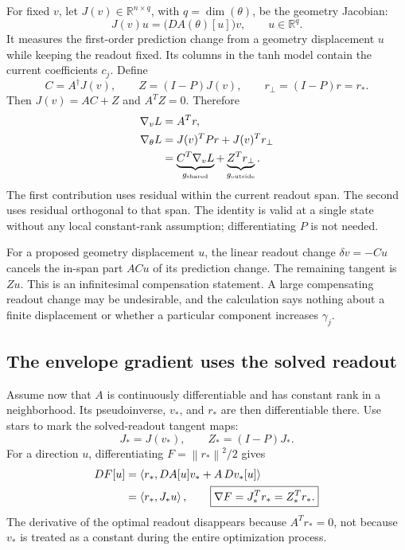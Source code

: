 \documentclass[11pt]{article}
\theoremstyle{remark}
\newcommand{\R}{\mathbb{R}}
\newcommand{\norm}[1]{\left\lVert #1\right\rVert}
\newcommand{\ip}[2]{\left\langle #1,#2\right\rangle}
\begin{document}
For fixed $v$, let $J(v)\in\R^{n\times q}$, with $q=\dim(\theta)$, be the geometry Jacobian:
\begin{equation}
 J(v)u=\bigl(DA(\theta)[u]\bigr)v,
 \qquad u\in\R^q.
 \label{eq:J}
\end{equation}
It measures the first-order prediction change from a geometry displacement $u$ while keeping the readout fixed. Its columns in the tanh model contain the current coefficients $c_j$. Define
\begin{equation}
 C=A^\dagger J(v),\qquad Z=(I-P)J(v),\qquad
 r_\perp=(I-P)r=r_*.
\end{equation}
Then $J(v)=AC+Z$ and $A^TZ=0$. Therefore
\begin{align}
 \nabla_vL&=A^Tr,\\
 \nabla_\theta L
 &=J(v)^TPr+J(v)^Tr_\perp\notag\\
 &=\underbrace{C^T\nabla_vL}_{g_{\rm shared}}
   +\underbrace{Z^Tr_\perp}_{g_{\rm outside}}.
 \label{eq:span-gradient}
\end{align}
The first contribution uses residual within the current readout span. The second uses residual orthogonal to that span. The identity is valid at a single state without any local constant-rank assumption; differentiating $P$ is not needed.

For a proposed geometry displacement $u$, the linear readout change $\delta v=-Cu$ cancels the in-span part $ACu$ of its prediction change. The remaining tangent is $Zu$. This is an infinitesimal compensation statement. A large compensating readout change may be undesirable, and the calculation says nothing about a finite displacement or whether a particular component increases $\gamma_j$.

\subsection{The envelope gradient uses the solved readout}

Assume now that $A$ is continuously differentiable and has constant rank in a neighborhood. Its pseudoinverse, $v_*$, and $r_*$ are then differentiable there. Use stars to mark the solved-readout tangent maps:
\begin{equation}
 J_*=J(v_*),\qquad Z_*=(I-P)J_*.
\end{equation}
For a direction $u$, differentiating $F=\norm{r_*}^2/2$ gives
\begin{align}
 DF[u]
 &=\ip{r_*}{DA[u]v_*+A\,Dv_*[u]}\notag\\
 &=\ip{r_*}{J_*u},\qquad
 \boxed{\nabla F=J_*^Tr_*=Z_*^Tr_*.}
 \label{eq:envelope}
\end{align}
The derivative of the optimal readout disappears because $A^Tr_*=0$, not because $v_*$ is treated as a constant during the entire optimization process.
\end{document}
